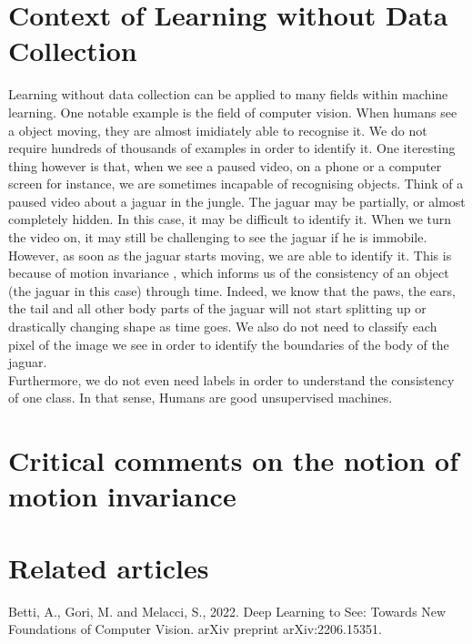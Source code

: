 \documentclass[12pt]{article}
\begin{document}
\section{Context of Learning without Data Collection}
Learning without data collection can be applied to many fields within machine learning. One notable example is the field of computer vision. When humans see a object moving, they are almost imidiately able to recognise it. We do not require hundreds of thousands of examples in order to identify it. One iteresting thing however is that, when we see a paused video, on a phone or a computer screen for instance, we are sometimes incapable of recognising objects. Think of a paused video about a jaguar in the jungle. The jaguar may be partially, or almost completely hidden. In this case, it may be difficult to identify it. When we turn the video on, it may still be challenging to see the jaguar if he is immobile. However, as soon as the jaguar starts moving, we are able to identify it. This is because of motion invariance \cite{gori2022}, which informs us of the consistency of an object (the jaguar in this case) through time. Indeed, we know that the paws, the ears, the tail and all other body parts of the jaguar will not start splitting up or drastically changing shape as time goes. We also do not need to classify each pixel of the image we see in order to identify the boundaries of the body of the jaguar.
\\
Furthermore, we do not even need labels in order to understand the consistency of one class. In that sense, Humans are good unsupervised machines.


\section{Critical comments on the notion of motion invariance}
\section{Related articles}

\begin{thebibliography}{99}
   Betti, A., Gori, M. and Melacci, S., 2022. Deep Learning to See: Towards New Foundations of Computer Vision. arXiv preprint arXiv:2206.15351.  
\end{thebibliography}
\end{document}
